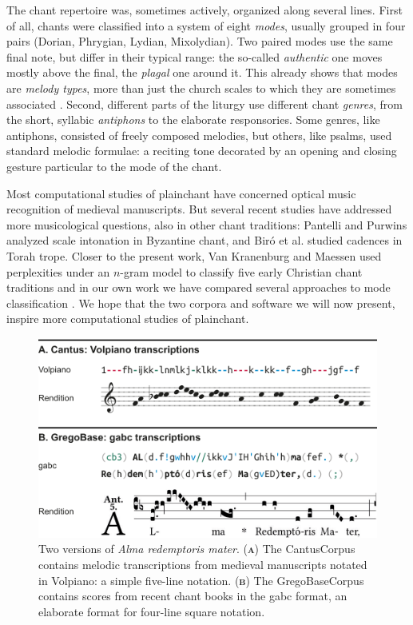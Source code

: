 \documentclass[sigconf,screen]{acmart}
\begin{document}
The chant repertoire was, sometimes actively, organized along several lines.
First of all, chants were classified into a system of eight \emph{modes}, usually grouped in four pairs (Dorian, Phrygian, Lydian, Mixolydian).
Two paired modes use the same final note, but differ in their typical range: the so-called \emph{authentic} one moves mostly above the final, the \emph{plagal} one around it.
This already shows that modes are \emph{melody types}, more than just the church scales to which they are sometimes associated \cite{Powers2001}.
Second, different parts of the liturgy use different chant \emph{genres}, from the short, syllabic \emph{antiphons} to the elaborate responsories.
Some genres, like antiphons, consisted of freely composed melodies, but others, like psalms, used standard melodic formulae: a reciting tone decorated by an opening and closing gesture particular to the mode of the chant.


Most computational studies of plainchant have concerned optical music recognition of medieval manuscripts.
But several recent studies have addressed more musicological questions, also in other chant traditions: Pantelli and Purwins \cite{Panteli2013} analyzed scale intonation in Byzantine chant, and Bir\'o et al. \cite{Biro2012} studied cadences in Torah trope.
Closer to the present work,
Van Kranenburg and Maessen \cite{vanKranenburg2017} used perplexities under an $n$-gram model to classify five early Christian chant traditions and in our own work we have compared several approaches to mode classification \cite{Cornelissen2020}.
We hope that the two corpora and software we will now present, inspire more computational studies of plainchant.


\begin{figure}[t]
    \includegraphics[width=\linewidth]{figures/fig01-volpiano-gabc.pdf}
    \caption{\normalfont
    Two versions of \emph{Alma redemptoris mater}.
    (\textbf{\textsc{a}}) The CantusCorpus contains melodic transcriptions from medieval manuscripts notated in Volpiano: a simple five-line notation. (\textbf{\textsc{b}}) The Grego\-BaseCorpus contains scores from recent chant books in the gabc format, an elaborate format for four-line square notation.
    }%
    \label{fig:gabc-volpiano}
\end{figure}
\end{document}
